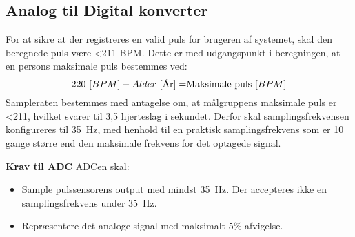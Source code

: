 \subsection{Analog til Digital konverter} \label{krav_adc}
For at sikre at der registreres en valid puls for brugeren af systemet, skal den beregnede puls være <211 BPM. Dette er med udgangspunkt i beregningen, at en persons maksimale puls bestemmes ved: \citep{CooperBlair2005} 
\begin{equation}
220~[BPM] - Alder~[$År$] = $Maksimale puls$~[BPM]
\end{equation}
Sampleraten bestemmes med antagelse om, at målgruppens maksimale puls er <211, hvilket svarer til 3,5 hjerteslag i sekundet. Derfor skal samplingsfrekvensen konfigureres til 35~Hz, med henhold til en praktisk samplingsfrekvens som er 10 gange større end den maksimale frekvens for det optagede signal. \citep{Webster2011}

\textbf{Krav til ADC} \newline
ADCen skal:
\begin{itemize}
	\item Sample pulssensorens output med mindst 35~Hz. Der accepteres ikke en samplingsfrekvens under 35~Hz. 
	\item Repræsentere det analoge signal med maksimalt 5\% afvigelse. 
\end{itemize}

